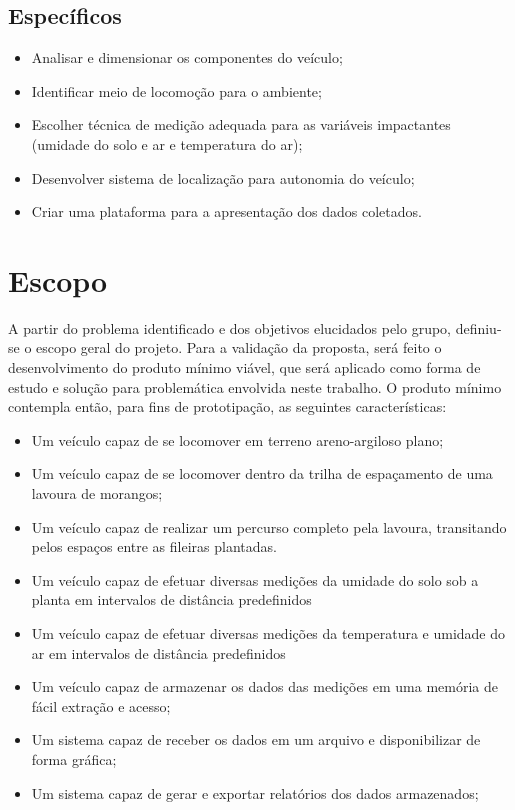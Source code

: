   \subsection{Específicos}

  \begin{itemize}
    \item Analisar e dimensionar os componentes do veículo;
    \item Identificar meio de locomoção para o ambiente;
    \item Escolher técnica de medição adequada para as variáveis impactantes (umidade do solo e ar e temperatura do ar);
    \item Desenvolver sistema de localização para autonomia do veículo;
    \item Criar uma plataforma para a apresentação dos dados coletados.
  \end{itemize}

  \vfill
  \pagebreak

  \section{Escopo}

  A partir do problema identificado e dos objetivos elucidados pelo grupo,
  definiu-se o escopo geral do projeto. Para a validação da proposta, será feito
  o desenvolvimento do produto mínimo viável, que será aplicado como forma de
  estudo e solução para problemática envolvida neste trabalho. O produto mínimo
  contempla então, para fins de prototipação, as seguintes características:

  \begin{itemize}
    \item Um veículo capaz de se locomover em terreno areno-argiloso plano;
    \item Um veículo capaz de se locomover dentro da trilha de espaçamento de uma lavoura de morangos;
    \item Um veículo capaz de realizar um percurso completo pela lavoura, transitando pelos espaços entre as fileiras plantadas.
    \item Um veículo capaz de efetuar diversas medições da umidade do solo sob a planta em intervalos de distância predefinidos
    \item Um veículo capaz de  efetuar diversas medições da temperatura e umidade do ar em intervalos de distância predefinidos
    \item Um veículo capaz de armazenar os dados das medições em uma memória de fácil extração e acesso;
    \item Um sistema capaz de receber os dados em um arquivo e disponibilizar de forma gráfica;
    \item Um sistema capaz de gerar e exportar relatórios dos dados armazenados;
  \end{itemize}
